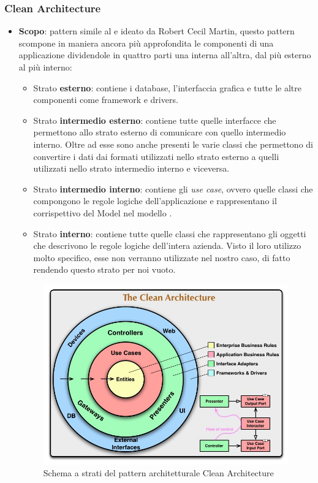 \subsubsection{Clean Architecture}
\begin{itemize}
	\item \textbf{Scopo}: pattern simile al  e ideato da Robert Cecil Martin, questo pattern scompone in maniera ancora più approfondita le componenti di una applicazione dividendole in quattro parti una interna all'altra, dal più esterno al più interno:
	\begin{itemize}
	  	\item Strato \textbf{esterno}: contiene i database, l'interfaccia grafica e tutte le altre componenti come framework e drivers.
	  	\item Strato \textbf{intermedio esterno}: contiene tutte quelle interfacce che permettono allo strato esterno di comunicare con quello intermedio interno. Oltre ad esse sono anche presenti le varie classi che permettono di convertire i dati dai formati utilizzati nello strato esterno a quelli utilizzati nello strato intermedio interno e viceversa.
	  	\item Strato \textbf{intermedio interno}: contiene gli \textit{use case}, ovvero quelle classi che compongono le regole logiche dell'applicazione e rappresentano il corrispettivo del Model nel modello .
	  	\item Strato \textbf{interno}: contiene tutte quelle classi che rappresentano gli oggetti che descrivono le regole logiche dell'intera azienda. Visto il loro utilizzo molto specifico, esse non verranno utilizzate nel nostro caso, di fatto rendendo questo strato per noi vuoto.
	\end{itemize}
	\begin{figure}[H]
	\centering
	\includegraphics[scale=0.3]{Sezioni/DesignPatterns/CleanArchitecture.jpg}
	\caption{Schema a strati del pattern architetturale Clean Architecture}
	\end{figure}
	

\end{itemize}
